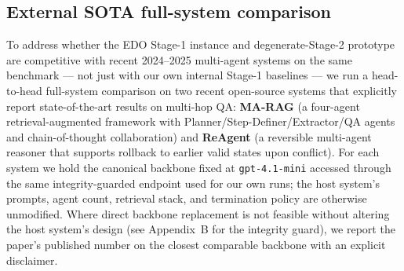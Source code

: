 \subsection{External SOTA full-system comparison}
\label{sec:external-sota}

To address whether the EDO Stage-1 instance and degenerate-Stage-2 prototype are competitive with recent 2024--2025 multi-agent systems on the same benchmark --- not just with our own internal Stage-1 baselines --- we run a head-to-head full-system comparison on two recent open-source systems that explicitly report state-of-the-art results on multi-hop QA: \textbf{MA-RAG} (a four-agent retrieval-augmented framework with Planner/Step-Definer/Extractor/QA agents and chain-of-thought collaboration) and \textbf{ReAgent} (a reversible multi-agent reasoner that supports rollback to earlier valid states upon conflict). For each system we hold the canonical backbone fixed at \texttt{gpt-4.1-mini} accessed through the same integrity-guarded endpoint used for our own runs; the host system's prompts, agent count, retrieval stack, and termination policy are otherwise unmodified. Where direct backbone replacement is not feasible without altering the host system's design (see Appendix~B for the integrity guard), we report the paper's published number on the closest comparable backbone with an explicit disclaimer.

